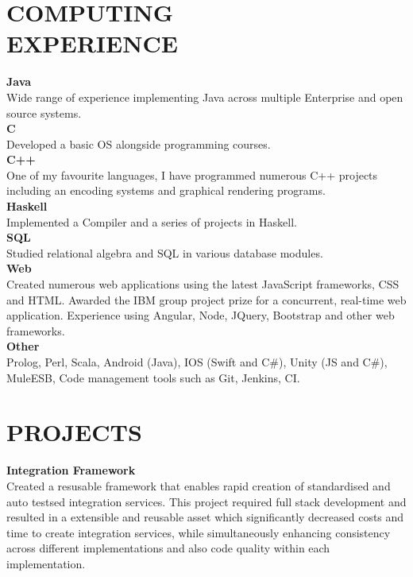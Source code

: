 \documentclass[margin, 10pt]{res} %
\begin{document}
\begin{resume}
\section{COMPUTING \\ EXPERIENCE} 

\textbf{Java} \\
Wide range of experience implementing Java across multiple Enterprise and open source systems. \\
\textbf{C} \\
Developed a basic OS alongside programming courses. \\
\textbf{C++} \\
One of my favourite languages, I have programmed numerous C++ projects including an encoding systems and graphical rendering programs. \\
\textbf{Haskell} \\
Implemented a Compiler and a series of projects in Haskell. \\
\textbf{SQL} \\
Studied relational algebra and SQL in various database modules. \\
\textbf{Web} \\
Created numerous web applications using the latest JavaScript frameworks, CSS and HTML. Awarded the IBM group project prize for a concurrent, real-time web application. Experience using Angular, Node, JQuery, Bootstrap and other web frameworks. \\
\textbf{Other} \\
Prolog, Perl, Scala, Android (Java), IOS (Swift and C\#), Unity (JS and C\#), MuleESB, Code management tools such as Git, Jenkins, CI. 

\newpage


\section{PROJECTS}

\textbf{Integration Framework} \\
Created a resusable framework that enables rapid creation of standardised and auto testsed integration services. This project required full stack development and resulted in a extensible and reusable asset which significantly decreased costs and time to create integration services, while simultaneously enhancing consistency across different implementations and also code quality within each implementation.


\end{resume}
\end{document}
